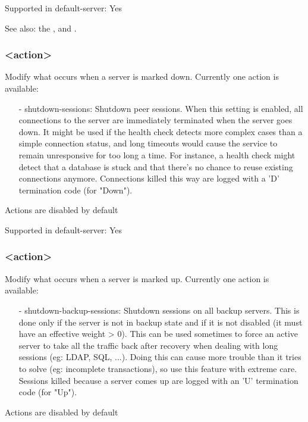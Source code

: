   Supported in default-server: Yes

  See also: the ,  and .

\subsubsection[on-marked-down]{ <action>}
  Modify what occurs when a server is marked down.
  Currently one action is available:
  \begin{itemize}
  \item[-] shutdown-sessions: Shutdown peer sessions. When this setting is enabled,
    all connections to the server are immediately terminated when the server
    goes down. It might be used if the health check detects more complex cases
    than a simple connection status, and long timeouts would cause the service
    to remain unresponsive for too long a time. For instance, a health check
    might detect that a database is stuck and that there's no chance to reuse
    existing connections anymore. Connections killed this way are logged with
    a 'D' termination code (for "Down").
  \end{itemize}

  Actions are disabled by default

  Supported in default-server: Yes

\subsubsection[on-marked-up]{ <action>}
  Modify what occurs when a server is marked up.
  Currently one action is available:
  \begin{itemize}
  \item[-] shutdown-backup-sessions: Shutdown sessions on all backup servers. This is
    done only if the server is not in backup state and if it is not disabled
    (it must have an effective weight > 0). This can be used sometimes to force
    an active server to take all the traffic back after recovery when dealing
    with long sessions (eg: LDAP, SQL, ...). Doing this can cause more trouble
    than it tries to solve (eg: incomplete transactions), so use this feature
    with extreme care. Sessions killed because a server comes up are logged
    with an 'U' termination code (for "Up").
  \end{itemize}

  Actions are disabled by default

